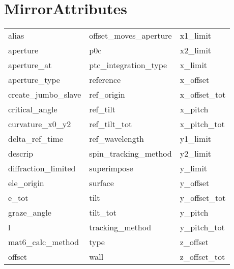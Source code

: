  \section{MirrorAttributes}
 \label{s:list.mirror}
 
 \begin{tabular}{lll} \toprule
alias                       & offset_moves_aperture       & x1_limit                    \\
aperture                    & p0c                         & x2_limit                    \\
aperture_at                 & ptc_integration_type        & x_limit                     \\
aperture_type               & reference                   & x_offset                    \\
create_jumbo_slave          & ref_origin                  & x_offset_tot                \\
critical_angle              & ref_tilt                    & x_pitch                     \\
curvature_x0_y2             & ref_tilt_tot                & x_pitch_tot                 \\
delta_ref_time              & ref_wavelength              & y1_limit                    \\
descrip                     & spin_tracking_method        & y2_limit                    \\
diffraction_limited         & superimpose                 & y_limit                     \\
ele_origin                  & surface                     & y_offset                    \\
e_tot                       & tilt                        & y_offset_tot                \\
graze_angle                 & tilt_tot                    & y_pitch                     \\
l                           & tracking_method             & y_pitch_tot                 \\
mat6_calc_method            & type                        & z_offset                    \\
offset                      & wall                        & z_offset_tot                \\
 \bottomrule
 \end{tabular}
 \vfill
 
